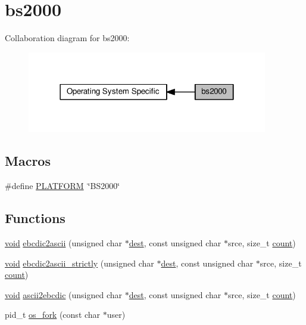 \hypertarget{group__APACHE__OS__BS2000}{}\section{bs2000}
\label{group__APACHE__OS__BS2000}
Collaboration diagram for bs2000\+:
\nopagebreak
\begin{figure}[H]
\begin{center}
\leavevmode
\includegraphics[width=298pt]{group__APACHE__OS__BS2000}
\end{center}
\end{figure}
\subsection*{Macros}
\begin{DoxyCompactItemize}
\item 
\#define \hyperlink{group__APACHE__OS__BS2000_ga1fa4f1561216be34f745f32aaa38d943}{P\+L\+A\+T\+F\+O\+RM}~\char`\"{}B\+S2000\char`\"{}
\end{DoxyCompactItemize}
\subsection*{Functions}
\begin{DoxyCompactItemize}
\item 
\hyperlink{group__MOD__ISAPI_gacd6cdbf73df3d9eed42fa493d9b621a6}{void} \hyperlink{group__APACHE__OS__BS2000_gaa79ced089926963e9d16496534b405d9}{ebcdic2ascii} (unsigned char $\ast$\hyperlink{group__apr__thread__proc_gaaf051c44ea7115367430b40d8fdd496e}{dest}, const unsigned char $\ast$srce, size\+\_\+t \hyperlink{pcregrep_8txt_aaaacc9f7ebd12563cc89b85ec6e261fb}{count})
\item 
\hyperlink{group__MOD__ISAPI_gacd6cdbf73df3d9eed42fa493d9b621a6}{void} \hyperlink{group__APACHE__OS__BS2000_ga2c2641e589b458a7a843d13e01a7a8b5}{ebcdic2ascii\+\_\+strictly} (unsigned char $\ast$\hyperlink{group__apr__thread__proc_gaaf051c44ea7115367430b40d8fdd496e}{dest}, const unsigned char $\ast$srce, size\+\_\+t \hyperlink{pcregrep_8txt_aaaacc9f7ebd12563cc89b85ec6e261fb}{count})
\item 
\hyperlink{group__MOD__ISAPI_gacd6cdbf73df3d9eed42fa493d9b621a6}{void} \hyperlink{group__APACHE__OS__BS2000_ga8db6a4a7993137e4c01d86fbb4368cc9}{ascii2ebcdic} (unsigned char $\ast$\hyperlink{group__apr__thread__proc_gaaf051c44ea7115367430b40d8fdd496e}{dest}, const unsigned char $\ast$srce, size\+\_\+t \hyperlink{pcregrep_8txt_aaaacc9f7ebd12563cc89b85ec6e261fb}{count})
\item 
pid\+\_\+t \hyperlink{group__APACHE__OS__BS2000_gacbdecddff32aa0ee1be0fd22f50f1371}{os\+\_\+fork} (const char $\ast$user)
\end{DoxyCompactItemize}
